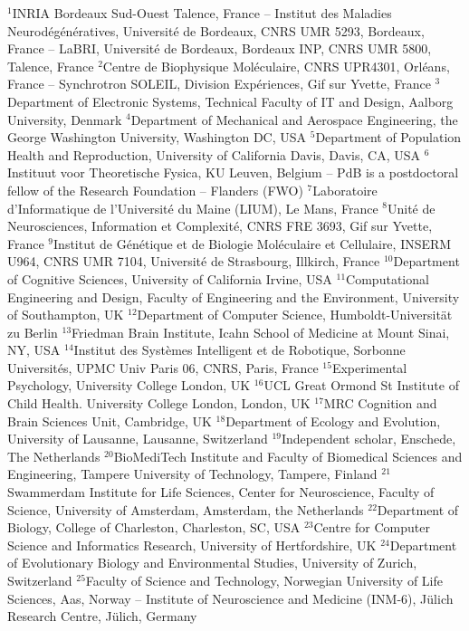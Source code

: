 $^{1}$INRIA Bordeaux Sud-Ouest Talence, France – Institut des Maladies Neurodégénératives, Université de Bordeaux, CNRS UMR 5293, Bordeaux, France – LaBRI, Université de Bordeaux, Bordeaux INP, CNRS UMR 5800, Talence, France
$^{2}$Centre de Biophysique Moléculaire, CNRS UPR4301, Orléans, France -- Synchrotron SOLEIL, Division Expériences, Gif sur Yvette, France
$^{3}$Department of Electronic Systems, Technical Faculty of IT and Design, Aalborg University, Denmark
$^{4}$Department of Mechanical and Aerospace Engineering, the George Washington University, Washington DC, USA
$^{5}$Department of Population Health and Reproduction, University of California Davis, Davis, CA, USA
$^{6}$Instituut voor Theoretische Fysica, KU Leuven, Belgium -- PdB is a postdoctoral fellow of the Research Foundation -- Flanders (FWO)
$^{7}$Laboratoire d'Informatique de l'Université du Maine (LIUM), Le Mans, France
$^{8}$Unité de Neurosciences, Information et Complexité, CNRS FRE 3693, Gif sur Yvette, France
$^{9}$Institut de Génétique et de Biologie Moléculaire et Cellulaire, INSERM U964, CNRS UMR 7104, Université de Strasbourg, Illkirch, France
$^{10}$Department of Cognitive Sciences, University of California Irvine, USA
$^{11}$Computational Engineering and Design, Faculty of Engineering and the Environment, University of Southampton, UK
$^{12}$Department of Computer Science, Humboldt-Universität zu Berlin
$^{13}$Friedman Brain Institute, Icahn School of Medicine at Mount Sinai, NY, USA
$^{14}$Institut des Systèmes Intelligent et de Robotique, Sorbonne Universités, UPMC Univ Paris 06, CNRS, Paris, France
$^{15}$Experimental Psychology, University College London, UK
$^{16}$UCL Great Ormond St Institute of Child Health. University College London, London, UK
$^{17}$MRC Cognition and Brain Sciences Unit, Cambridge, UK
$^{18}$Department of Ecology and Evolution, University of Lausanne, Lausanne, Switzerland
$^{19}$Independent scholar, Enschede, The Netherlands
$^{20}$BioMediTech Institute and Faculty of Biomedical Sciences and Engineering, Tampere University of Technology, Tampere, Finland
$^{21}$Swammerdam Institute for Life Sciences, Center for Neuroscience, Faculty of Science, University of Amsterdam, Amsterdam, the Netherlands
$^{22}$Department of Biology, College of Charleston, Charleston, SC, USA
$^{23}$Centre for Computer Science and Informatics Research, University of Hertfordshire, UK
$^{24}$Department of Evolutionary Biology and Environmental Studies, University of Zurich, Switzerland
$^{25}$Faculty of Science and Technology, Norwegian University of Life Sciences, Aas, Norway -- Institute of Neuroscience and Medicine (INM-6), Jülich Research Centre, Jülich, Germany
